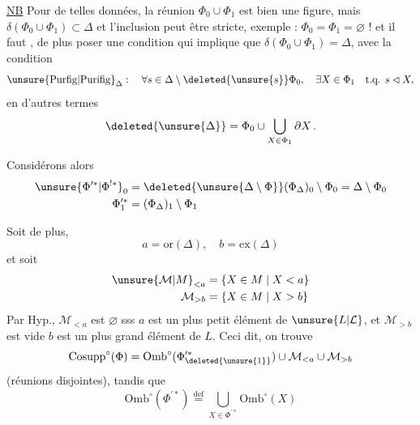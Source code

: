 
\unsure{(}\uline{NB} Pour de telles données, la réunion $\Phi_0\cup\Phi_1$ est bien une figure, mais $\delta(\Phi_0\cup\Phi_1)\subset\Delta$ et l'inclusion peut être stricte, exemple : $\Phi_0=\Phi_1=\varnothing$ !\unsure{)} et il faut , de plus poser une condition qui implique que $\delta(\Phi_0\cup\Phi_1)=\Delta$\unsure{\}},  avec la condition
\[
\unsure{\mathrm{Purfig}|\mathrm{Purifig}}_{\Delta}:\quad\forall s\in\Delta\setminus\deleted{\unsure{s}}\Phi_0,\quad\exists X\in\Phi_1\quad\text{t.q. }s\lhd X,
\]
en d'autres termes
\[
\deleted{\unsure{\Delta}}=\Phi_0\cup\bigcup_{X\in\Phi_1}\partial X\,.
\]

Considérons alors
\[
\begin{aligned}
\unsure{\Phi^{\prime *}|\Phi^{!*}}_0&=\deleted{\unsure{\Delta\setminus\Phi}}(\Phi_{\Delta})_0\setminus\Phi_0=\Delta\setminus\Phi_0\\
\Phi^{\prime *}_1&=(\Phi_{\Delta})_1\setminus\Phi_1
\end{aligned}
\]

Soit de plus, 
\[
a=\mathrm{or}(\Delta),\quad b=\mathrm{ex}(\Delta)
\]
et soit
\[
\begin{aligned}
\unsure{\mathcal{M}|M}_{<a}&=\{X\in M\mid X<a\}\\
\mathcal{M}_{>b}&=\{X\in M\mid X>b\}
\end{aligned}
\]
Par Hyp., $\mathcal{M}_{<a}$ est $\varnothing$ sss $a$ est un plus petit élément de $\unsure{L|\mathcal{L}}$, et $\mathcal{M}_{>b}$ est vide  $b$ est un plus grand élément de $L$. Ceci dit, on trouve 
\[
\mathrm{Cosupp}^{\circ}(\Phi)=\mathrm{Omb}^{\circ}(\Phi^{\prime *}_{\deleted{\unsure{1}}})\cup\mathcal{M}_{<a}\cup\mathcal{M}_{>b}
\]
(réunions disjointes), tandis que
\[
\mathrm{Omb}^{\circ}(\Phi^{\prime *})\overset{\mathrm{def}}{=}\bigcup_{X\in\Phi^{\prime *}}\mathrm{Omb}^{\circ}(X)
\]
